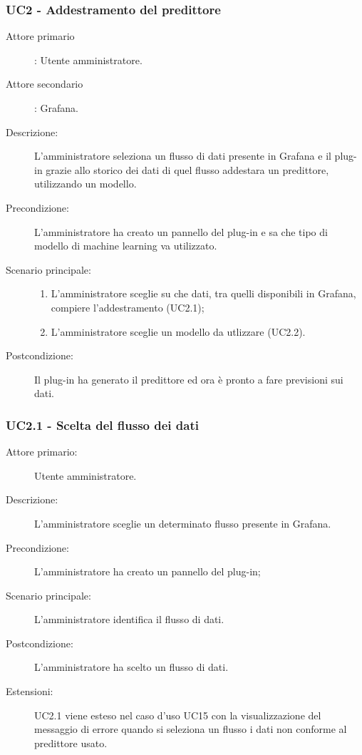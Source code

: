 \subsubsection{UC2 - Addestramento del predittore}
\label{sssec:uc2}
\begin{description}
  \item[Attore primario]: Utente amministratore.
  \item[Attore secondario]: Grafana.
  \item[Descrizione:] L'amministratore seleziona un flusso di dati presente in Grafana e il plug-in grazie allo storico dei dati di quel flusso addestara un predittore, utilizzando un modello.
  \item[Precondizione:] L'amministratore ha creato un pannello del plug-in e sa che tipo di modello di machine learning va utilizzato.
  \item[Scenario principale:]
  \begin{enumerate}
    \item L'amministratore sceglie su che dati, tra quelli disponibili in Grafana, compiere l'addestramento (UC2.1);
    \item L'amministratore sceglie un modello da utlizzare (UC2.2).
  \end{enumerate}
  \item[Postcondizione:] Il plug-in ha generato il predittore ed ora è pronto a fare previsioni sui dati.
\end{description}

\subsubsection{UC2.1 - Scelta del flusso dei dati}
\label{sssec:uc2.1}
\begin{description}
  \item[Attore primario:] Utente amministratore.
  \item[Descrizione:] L'amministratore sceglie un determinato flusso presente in Grafana.
  \item[Precondizione:] L'amministratore ha creato un pannello del plug-in;
  \item[Scenario principale:] L'amministratore identifica il flusso di dati.
  \item[Postcondizione:] L'amministratore ha scelto un flusso di dati.
  \item[Estensioni:] UC2.1 viene esteso nel caso d'uso UC15 con la visualizzazione del messaggio di errore quando si seleziona un flusso i dati non conforme al predittore usato.
\end{description}

